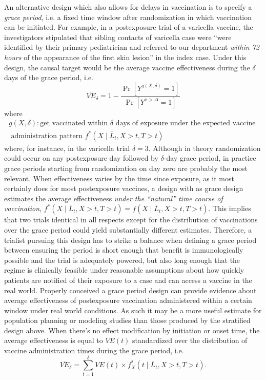 \begin{appendix}
    An alternative design which also allows for delays in vaccination is to specify a \textit{grace period}, i.e. a fixed time window after randomization in which vaccination can be initiated. For example, in a postexposure trial of a varicella vaccine, the investigators stipulated that sibling contacts of varicella case were ``were identified by their primary pediatrician and referred to our department \textit{within 72 hours} of the appearance of the first skin lesion'' in the index case. Under this design, the causal target would be the average vaccine effectiveness during the $\delta$ days of the grace period, i.e.
    $$
    \overline{VE}_\delta = 1 - \frac{\Pr[Y^{g(X,\delta)} = 1]}{\Pr[Y^{x > \Delta} = 1]}
    $$ 
    where
    \begin{gather*}
        g(X,\delta): \text{get vaccinated within $\delta$ days of exposure under the expected vaccine } \\ \text{ administration pattern }  f^*(X \mid \overline{L}_t, X > t, T > t)
    \end{gather*}
    where, for instance, in the varicella trial $\delta = 3$. Although in theory randomization could occur on any postexposure day followed by $\delta$-day grace period, in practice grace periods starting from randomization on day zero are probably the most relevant. When effectiveness varies by the time since exposure, as it most certainly does for most postexposure vaccines, a design with as grace design estimates the average effectiveness \textit{under the ``natural'' time course of vaccination}, $f^*(X \mid \overline{L}_t, X > t, T > t) = f(X \mid \overline{L}_t, X > t, T > t)$. This implies that two trials identical in all respects except for the distribution of vaccinations over the grace period could yield substantially different estimates. Therefore, a trialist pursuing this design has to strike a balance when defining a grace period between ensuring the period is short enough that benefit is immunologically possible and the trial is adequately powered, but also long enough that the regime is clinically feasible under reasonable assumptions about how quickly patients are notified of their exposure to a case and can access a vaccine in the real world. Properly conceived a grace period design can provide evidence about average effectiveness of postexposure vaccination administered within a certain window under real world conditions. As such it may be a more useful estimate for population planning or modeling studies than those produced by the stratified design above. When there's no effect modification by initiation or onset time, the average effectiveness is equal to $VE(t)$ standardized over the distribution of vaccine administration times during the grace period, i.e.
    $$\overline{VE}_\delta = \sum_{t = 1}^\delta VE(t) \times f^*_X(t \mid \overline{L}_t, X > t, T > t).$$


\end{appendix}

